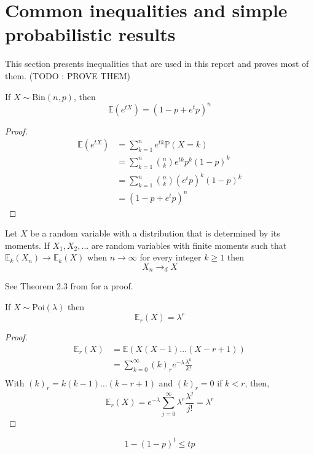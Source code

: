 \section{Common inequalities and simple probabilistic results}
This section presents inequalities that are used in this report and proves most of them. (TODO : PROVE THEM)
\begin{theorem}\label{binMGF}
	If $X \sim \text{Bin}(n, p)$, then 
	\begin{equation}
		\mathbb{E}(e^{tX}) = (1 - p + e^t p)^n
	\end{equation}
\end{theorem}
\begin{proof}
	\begin{align}
		\mathbb{E}(e^{tX}) 	&= \sum_{k=1}^n e^{tk} \mathbb{P}(X =k) \\
					&= \sum_{k=1}^n \binom{n}{k} e^{tk}p^k(1-p)^k  \\
					&= \sum_{k=1}^n \binom{n}{k} (e^tp)^k(1-p)^k  \\
					&=(1 - p + e^t p)^n
	\end{align}
\end{proof}
\begin{theorem}
	Let $X$ be a random variable with a distribution that is determined by its moments. If $X_1, X_2, ...$ are random variables with finite moments such that
	$\mathbb{E}_k(X_n) \longrightarrow \mathbb{E}_k(X)$ when $ n \to \infty$ for every integer $k \geq 1$ then
	\begin{equation}
		X_n \longrightarrow_d X
	\end{equation}
\end{theorem}
See Theorem 2.3 from \cite{Hofstad16} for a proof.
\begin{theorem}\label{th:factPois}
	If $X \sim \text{Poi}(\lambda)$ then
	\begin{equation}
		\mathbb{E}_r(X) = \lambda^r
	\end{equation}
\end{theorem}
\begin{proof}
	\begin{align}
		\mathbb{E}_r(X) &= \mathbb{E}(X(X-1)\ldots(X-r+1)) \\
		&= \sum_{k=0}^{\infty} (k)_r e^{-\lambda} \frac{\lambda^k}{k!} \\
	\end{align}
	With $(k)_r = k(k-1)\ldots(k-r+1)$ and $(k)_r = 0$ if $k<r$, then,
	\begin{equation}
		\mathbb{E}_r(X) = e^{-\lambda}\sum_{j=0}^{\infty} \lambda^r \frac{\lambda^j}{j!} = \lambda^r
	\end{equation}
\end{proof}
\begin{theorem}\label{bernoulli}
	\begin{equation}
		1 - (1-p)^t \leq tp
	\end{equation}
\end{theorem}

